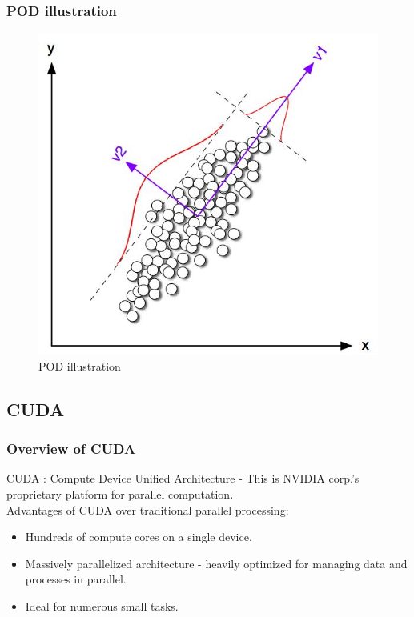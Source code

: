 \documentclass{beamer}
\begin{document}
\begin{frame}
\frametitle{POD illustration}


\begin{figure}[H]
 \includegraphics[scale=0.75]{pca_ex.jpg}
 \caption{POD illustration}
 \label{pod}
\end{figure}

\end{frame}


\subsection{CUDA}

\begin{frame}
\frametitle{Overview of CUDA}
CUDA : Compute Device Unified Architecture - This is NVIDIA corp.'s proprietary platform for parallel computation. \\
Advantages of CUDA over traditional parallel processing:
\begin{itemize}
\item
Hundreds of compute cores on a single device. 
\item
Massively parallelized architecture - heavily optimized for managing data and processes in parallel.
\item
Ideal for numerous small tasks.
\end{itemize}
\end{frame}
\end{document}
